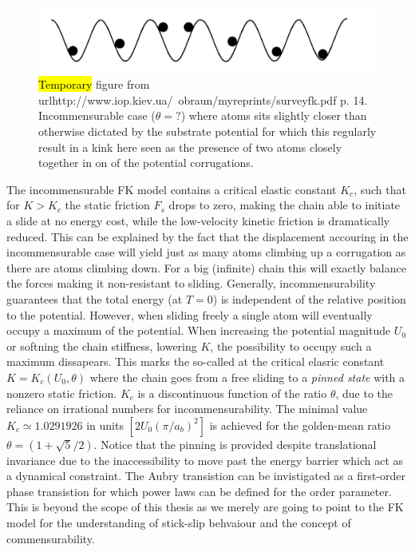 \begin{figure}[H]
  \centering
  \includegraphics[width=0.5\linewidth]{figures/theory/incommensurable_example.png}
  \caption{\hl{Temporary} figure from
  url{http://www.iop.kiev.ua/~obraun/myreprints/surveyfk.pdf} p. 14.
  Incommensurable case ($\theta = ?$) where atoms sits slightly closer than
  otherwise dictated by the substrate potential for which this regularly result
  in a kink here seen as the presence of two atoms closely together in on of the
  potential corrugations.}
  \label{fig:incommensurable_example}
\end{figure}


The incommensurable FK model contains a critical elastic constant $K_c$, such
that for $K > K_c$ the static friction $F_s$ drops to zero, making the chain able to initiate a slide at no energy cost, while the low-velocity kinetic friction is dramatically reduced. This can be explained by the
fact that the displacement accouring in the incommensurable case will yield just
as many atoms climbing up a corrugation as there are atoms climbing down. For a big (infinite) chain this will exactly balance the forces making it
non-resistant to sliding. Generally, incommensurability guarantees that the
total energy (at $T=0$) is independent of the relative position to the
potential. However, when sliding freely a single atom will eventually occupy a
maximum of the potential. When increasing the potential magnitude $U_0$ or
softning the chain stiffness, lowering $K$, the possibility to occupy such a
maximum dissapears. This marks the so-called 
at the critical elasric constant $K = K_c(U_0, \theta)$ where the chain goes
from a free sliding to a \textit{pinned state} with a nonzero static friction.
$K_c$ is a discontinuous function of the ratio $\theta$, due to the reliance on
irrational numbers for incommensurability. The minimal
value $K_c \simeq 1.0291926 $ in units $[2 U_0 (\pi / a_b)^2]$ is achieved for
the golden-mean ratio $\theta = (1+\sqrt{5}/2)$. Notice that the pinning is
provided despite translational invariance due to the inaccessibility to move
past the energy barrier which act as a dynamical constraint. The Aubry transistion
can be invistigated as a first-order phase transistion for which power laws can be
defined for the order parameter. This is beyond the scope of this thesis as we
merely are going to point to the FK model for the understanding of stick-slip
behvaiour and the concept of commensurability.

